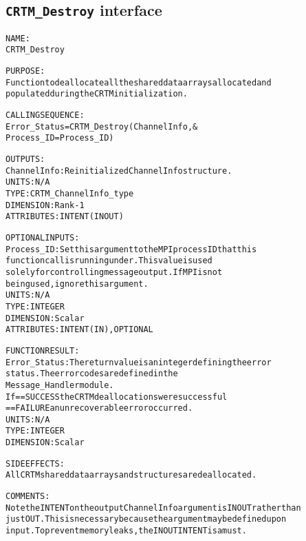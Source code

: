 \subsection{\texttt{CRTM\_Destroy} interface}
  \label{sec:CRTM_Destroy_interface}
  \begin{alltt}
 
  NAME:
        CRTM_Destroy
 
  PURPOSE:
        Function to deallocate all the shared data arrays allocated and
        populated during the CRTM initialization.
 
  CALLING SEQUENCE:
        Error_Status = CRTM_Destroy( ChannelInfo            , &
                                     Process_ID = Process_ID  )
 
  OUTPUTS:
        ChannelInfo:  Reinitialized ChannelInfo structure.
                      UNITS:      N/A
                      TYPE:       CRTM_ChannelInfo_type
                      DIMENSION:  Rank-1
                      ATTRIBUTES: INTENT(IN OUT)
 
  OPTIONAL INPUTS:
        Process_ID:   Set this argument to the MPI process ID that this
                      function call is running under. This value is used
                      solely for controlling message output. If MPI is not
                      being used, ignore this argument.
                      UNITS:      N/A
                      TYPE:       INTEGER
                      DIMENSION:  Scalar
                      ATTRIBUTES: INTENT(IN), OPTIONAL
 
  FUNCTION RESULT:
        Error_Status: The return value is an integer defining the error
                      status. The error codes are defined in the
                      Message_Handler module.
                      If == SUCCESS the CRTM deallocations were successful
                         == FAILURE an unrecoverable error occurred.
                      UNITS:      N/A
                      TYPE:       INTEGER
                      DIMENSION:  Scalar
 
  SIDE EFFECTS:
        All CRTM shared data arrays and structures are deallocated.
 
  COMMENTS:
        Note the INTENT on the output ChannelInfo argument is IN OUT rather than
        just OUT. This is necessary because the argument may be defined upon
        input. To prevent memory leaks, the IN OUT INTENT is a must.
 
  \end{alltt}
